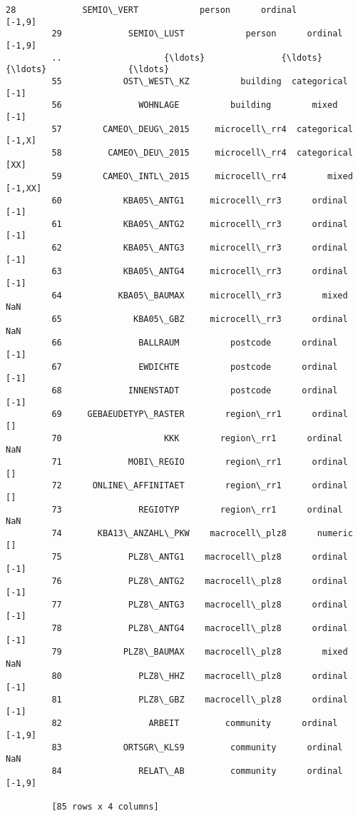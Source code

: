 \documentclass[11pt]{article}
\begin{document}
\begin{Verbatim}[commandchars=\\\{\}]
         28             SEMIO\_VERT            person      ordinal             [-1,9]
         29             SEMIO\_LUST            person      ordinal             [-1,9]
         ..                    {\ldots}               {\ldots}          {\ldots}                {\ldots}
         55            OST\_WEST\_KZ          building  categorical               [-1]
         56               WOHNLAGE          building        mixed               [-1]
         57        CAMEO\_DEUG\_2015     microcell\_rr4  categorical             [-1,X]
         58         CAMEO\_DEU\_2015     microcell\_rr4  categorical               [XX]
         59        CAMEO\_INTL\_2015     microcell\_rr4        mixed            [-1,XX]
         60            KBA05\_ANTG1     microcell\_rr3      ordinal               [-1]
         61            KBA05\_ANTG2     microcell\_rr3      ordinal               [-1]
         62            KBA05\_ANTG3     microcell\_rr3      ordinal               [-1]
         63            KBA05\_ANTG4     microcell\_rr3      ordinal               [-1]
         64           KBA05\_BAUMAX     microcell\_rr3        mixed                NaN
         65              KBA05\_GBZ     microcell\_rr3      ordinal                NaN
         66               BALLRAUM          postcode      ordinal               [-1]
         67               EWDICHTE          postcode      ordinal               [-1]
         68             INNENSTADT          postcode      ordinal               [-1]
         69     GEBAEUDETYP\_RASTER        region\_rr1      ordinal                 []
         70                    KKK        region\_rr1      ordinal                NaN
         71             MOBI\_REGIO        region\_rr1      ordinal                 []
         72      ONLINE\_AFFINITAET        region\_rr1      ordinal                 []
         73               REGIOTYP        region\_rr1      ordinal                NaN
         74       KBA13\_ANZAHL\_PKW    macrocell\_plz8      numeric                 []
         75             PLZ8\_ANTG1    macrocell\_plz8      ordinal               [-1]
         76             PLZ8\_ANTG2    macrocell\_plz8      ordinal               [-1]
         77             PLZ8\_ANTG3    macrocell\_plz8      ordinal               [-1]
         78             PLZ8\_ANTG4    macrocell\_plz8      ordinal               [-1]
         79            PLZ8\_BAUMAX    macrocell\_plz8        mixed                NaN
         80               PLZ8\_HHZ    macrocell\_plz8      ordinal               [-1]
         81               PLZ8\_GBZ    macrocell\_plz8      ordinal               [-1]
         82                 ARBEIT         community      ordinal             [-1,9]
         83            ORTSGR\_KLS9         community      ordinal                NaN
         84               RELAT\_AB         community      ordinal             [-1,9]
         
         [85 rows x 4 columns]
\end{Verbatim}
            
\end{document}
